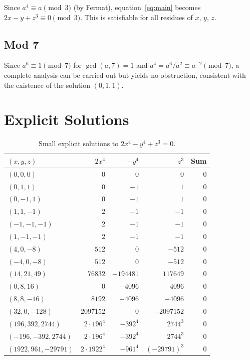 \documentclass[12pt,a4paper]{article}
\theoremstyle{definition}
\begin{document}
Since $a^4 \equiv a \pmod 3$ (by Fermat), equation~\eqref{eq:main} becomes
$2x - y + z^3 \equiv 0 \pmod 3$.  This is satisfiable for all residues of $x$, $y$, $z$.

\subsection{Mod 7}

Since $a^6 \equiv 1 \pmod 7$ for $\gcd(a,7)=1$ and $a^4 = a^6/a^2 \equiv a^{-2} \pmod 7$,
a complete analysis can be carried out but yields no obstruction, consistent with the
existence of the solution $(0,1,1)$.

\section{Explicit Solutions}\label{sec:solutions}

\begin{table}[h]
\centering
\caption{Small explicit solutions to $2x^4 - y^4 + z^3 = 0$.}
\label{tab:solutions}
\begin{tabular}{@{}lrrrr@{}}
\toprule
$(x, y, z)$ & $2x^4$ & $-y^4$ & $z^3$ & Sum \\
\midrule
$(0, 0, 0)$ & $0$ & $0$ & $0$ & $0$ \\
$(0, 1, 1)$ & $0$ & $-1$ & $1$ & $0$ \\
$(0, -1, 1)$ & $0$ & $-1$ & $1$ & $0$ \\
$(1, 1, -1)$ & $2$ & $-1$ & $-1$ & $0$ \\
$(-1, -1, -1)$ & $2$ & $-1$ & $-1$ & $0$ \\
$(1, -1, -1)$ & $2$ & $-1$ & $-1$ & $0$ \\
$(4, 0, -8)$ & $512$ & $0$ & $-512$ & $0$ \\
$(-4, 0, -8)$ & $512$ & $0$ & $-512$ & $0$ \\
$(14, 21, 49)$ & $76832$ & $-194481$ & $117649$ & $0$ \\
$(0, 8, 16)$ & $0$ & $-4096$ & $4096$ & $0$ \\
$(8, 8, -16)$ & $8192$ & $-4096$ & $-4096$ & $0$ \\
$(32, 0, -128)$ & $2097152$ & $0$ & $-2097152$ & $0$ \\
$(196, 392, 2744)$ & $2\cdot196^4$ & $-392^4$ & $2744^3$ & $0$ \\
$(-196, -392, 2744)$ & $2\cdot196^4$ & $-392^4$ & $2744^3$ & $0$ \\
$(1922, 961, {-}29791)$ & $2\cdot1922^4$ & $-961^4$ & $(-29791)^3$ & $0$ \\
\bottomrule
\end{tabular}
\end{table}
\end{document}
